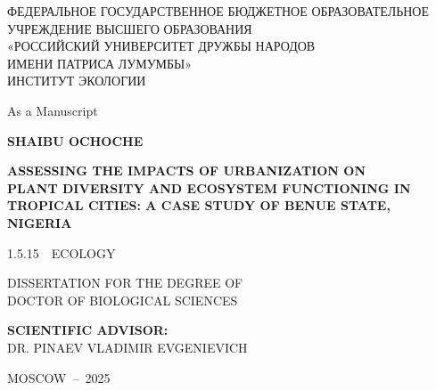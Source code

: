 \begin{titlepage}
    \centering
    \vspace*{1cm}

    {\large ФЕДЕРАЛЬНОЕ ГОСУДАРСТВЕННОЕ БЮДЖЕТНОЕ ОБРАЗОВАТЕЛЬНОЕ\\
    УЧРЕЖДЕНИЕ ВЫСШЕГО ОБРАЗОВАНИЯ\\
    «РОССИЙСКИЙ УНИВЕРСИТЕТ ДРУЖБЫ НАРОДОВ\\
    ИМЕНИ ПАТРИСА ЛУМУМБЫ»\\
    ИНСТИТУТ ЭКОЛОГИИ}

    \vspace{1.5cm}

    {\normalsize As a Manuscript}

    \vspace{2cm}

    {\Large\bfseries SHAIBU OCHOCHE}

    \vspace{1.5cm}

    {\LARGE\bfseries ASSESSING THE IMPACTS OF URBANIZATION ON\\
    PLANT DIVERSITY AND ECOSYSTEM FUNCTIONING IN\\
    TROPICAL CITIES: A CASE STUDY OF BENUE STATE, NIGERIA}

    \vspace{1.5cm}

    {\large 1.5.15~~ECOLOGY}

    \vspace{1cm}

    {\large DISSERTATION FOR THE DEGREE OF\\
    DOCTOR OF BIOLOGICAL SCIENCES}

    \vfill

    {\normalsize
    \textbf{SCIENTIFIC ADVISOR:}\\
    DR. PINAEV VLADIMIR EVGENIEVICH
    }

    \vspace{1cm}

    {\large MOSCOW~--~2025}

\end{titlepage}

\tableofcontents
\cleardoublepage
